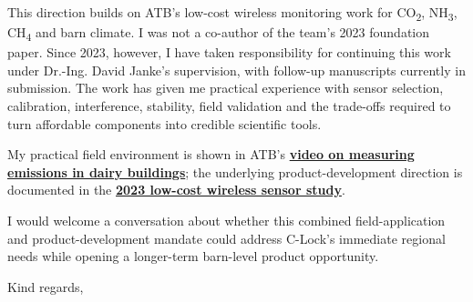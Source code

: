 \documentclass[10pt,a4paper]{article}
\begin{document}
This direction builds on ATB's low-cost wireless monitoring work for CO\textsubscript{2}, NH\textsubscript{3}, CH\textsubscript{4} and barn climate. I was not a co-author of the team's 2023 foundation paper. Since 2023, however, I have taken responsibility for continuing this work under Dr.-Ing. David Janke's supervision, with follow-up manuscripts currently in submission. The work has given me practical experience with sensor selection, calibration, interference, stability, field validation and the trade-offs required to turn affordable components into credible scientific tools.

My practical field environment is shown in ATB's \href{https://youtu.be/41Y6egqsQDI}{\textcolor{fieldgreen}{\textbf{video on measuring emissions in dairy buildings}}}; the underlying product-development direction is documented in the \href{https://www.mdpi.com/2073-4433/14/11/1643}{\textcolor{fieldgreen}{\textbf{2023 low-cost wireless sensor study}}}.

I would welcome a conversation about whether this combined field-application and product-development mandate could address C-Lock's immediate regional needs while opening a longer-term barn-level product opportunity.

Kind regards,

\vspace{8pt}
{\brandfont\bfseries\color{fieldgreen}\CandidateName}
\end{document}
